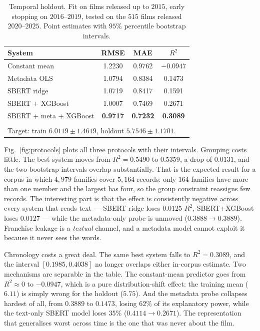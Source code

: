 \documentclass[conference,a4paper]{IEEEtran}
\begin{document}
\begin{table}[t]
\caption{Temporal holdout. Fit on films released up to $2015$, early
stopping on $2016$--$2019$, tested on the $515$ films released
$2020$--$2025$. Point estimates with $95\%$ percentile bootstrap
intervals.}
\label{tab:temporal}
\centering
\small
\begin{tabular}{lccc}
\toprule
\textbf{System} & RMSE & MAE & $R^{2}$ \\
\midrule
Constant mean   & 1.2230 & 0.9762 & $-0.0947$ \\
Metadata OLS    & 1.0794 & 0.8384 & 0.1473 \\
SBERT ridge     & 1.0719 & 0.8417 & 0.1591 \\
SBERT + XGBoost & 1.0007 & 0.7469 & 0.2671 \\
SBERT + meta + XGBoost & \textbf{0.9717} & \textbf{0.7232} & \textbf{0.3089} \\
\addlinespace[2pt]
\multicolumn{4}{l}{\footnotesize Best system $R^{2}\in[0.1985,0.4038]$;
$n = 3{,}918 / 731 / 515$; $\lambda = 6.41\%$.}\\
\multicolumn{4}{l}{\footnotesize Target: train $6.0119 \pm 1.4619$,
holdout $5.7546 \pm 1.1701$.}\\
\bottomrule
\end{tabular}
\end{table}

Fig.~\ref{fig:protocols} plots all three protocols with their intervals.
Grouping costs little. The best system moves from $R^{2} = 0.5490$ to
$0.5359$, a drop of $0.0131$, and the two bootstrap intervals overlap
substantially. That is the expected result for a corpus in which
$4{,}979$ families cover $5{,}164$ records: only $164$ families have more
than one member and the largest has four, so the group constraint
reassigns few records. The interesting part is that the effect is
consistently negative across every system that reads text --- SBERT ridge
loses $0.0125$ $R^{2}$, SBERT+XGBoost loses $0.0127$ --- while the
metadata-only probe is unmoved ($0.3888 \to 0.3889$). Franchise leakage
is a \emph{textual} channel, and a metadata model cannot exploit it
because it never sees the words.

Chronology costs a great deal. The same best system falls to
$R^{2} = 0.3089$, and the interval $[0.1985, 0.4038]$ no longer overlaps
either in-corpus estimate. Two mechanisms are separable in the table. The
constant-mean predictor goes from $R^{2} \approx 0$ to $-0.0947$, which
is a pure distribution-shift effect: the training mean ($6.11$) is
simply wrong for the holdout ($5.75$). And the metadata probe collapses
hardest of all, from $0.3889$ to $0.1473$, losing $62\%$ of its
explanatory power, while the text-only SBERT model loses $35\%$
($0.4114 \to 0.2671$). The representation that generalises worst across
time is the one that was never about the film.
\end{document}
